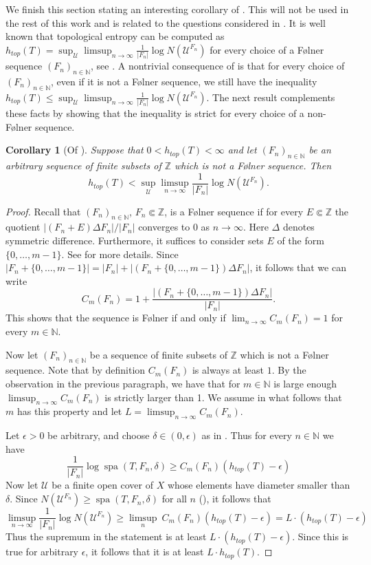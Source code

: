 \documentclass[a4paper,oneside]{amsart}
\renewcommand{\(}{\begin{dmath*}}
\renewcommand{\)}{\end{dmath*}}
\newtheorem{corollary}[theorem]{Corollary}
\theoremstyle{definition}
\newcommand{\N}{\mathbb{N}}
\newcommand{\Z}{\mathbb{Z}}
\newcommand{\U}{\mathcal{U}}
\newcommand{\spa}{\operatorname{spa}}
\begin{document}
We finish this section stating an interesting corollary of . This will not be used in the rest of this work and is related to the questions considered  in \cite{kolyada_shearers_2016}. It is well known that topological entropy can be computed as $h_{top}(T)=\sup_{\U}\limsup_{n\to\infty}\frac{1}{|F_n|}\log N(\U^{F_n})$  for every choice of a F\o lner sequence $(F_n)_{n\in\N}$,  see \cite{kolyada_shearers_2016}. A nontrivial consequence of  
is that for every choice of  $(F_n)_{n\in\N}$, even if it is not a F\o lner sequence, we still have the inequality $h_{top}(T)\leq \sup_{\U}\limsup_{n\to\infty}\frac{1}{|F_n|}\log N(\U^{F_n})$. The next result  complements these facts by showing that the inequality is strict for every choice of a non-F\o lner sequence. 
\begin{corollary}[Of ]
Suppose that $0<h_{top}(T)<\infty$ and let $(F_n)_{n\in\N}$ be an arbitrary sequence of finite subsets of $\Z$ which is not a F\o lner sequence. Then 
\begin{equation}\label{limsup-nonfolner}h_{top}(T)<\sup_{\U}\limsup_{n\to \infty}\frac{1}{|F_n|}\log N(\U^{F_n}).\end{equation}
\end{corollary}
\begin{proof}
Recall that $(F_n)_{n\in\N}$, $F_n\Subset \Z$, is a F\o lner sequence if for every $E\Subset\Z$ the quotient $|(F_n+E)\Delta F_n|/|F_n|$ converges to $0$ as $n\to\infty$. Here $\Delta$ denotes symmetric difference. Furthermore, it suffices to consider sets $E$ of the form $\{0,\dots,m-1\}$. See  \cite[Proposition 4.6.1]{ceccherini-silberstein_cellular_2010} for more details. Since $|F_n+\{0,\dots,m-1\}|=|F_n|+|(F_n+\{0,\dots,m-1\})\Delta F_n|$, it follows that  we can write
\[C_m(F_n)=1+\frac{|(F_n+\{0,\dots,m-1\})\Delta F_n|}{|F_n|}.\]
This shows that the sequence is F\o lner if and only if $\lim_{n\to\infty}C_m(F_n)=1$ for every $m\in\N$. 

Now let $(F_n)_{n\in\N}$ be a sequence of finite subsets of $\Z$ which is not a F\o lner sequence. Note that by definition $C_m(F_n)$ is always at least $1$. By the observation in the previous paragraph, we have that for $m\in\N$ is large enough $\limsup_{n\to\infty}C_m(F_n)$ is strictly larger than 1. We assume in what follows that $m$ has this property and let $L=\limsup_{n\to\infty}C_m(F_n)$.  

Let $\epsilon>0$ be arbitrary, and choose $\delta\in(0,\epsilon)$ as in . Thus for every $n\in\N$ we have \[\frac{1}{|F_n|}\log \spa(T,F_n,\delta)\geq 
 C_m(F_n)(h_{top}(T) -\epsilon)\]
 Now let $\U$ be a finite open cover of $X$ whose elements have diameter smaller than $\delta$. Since $N(\U^{F_n})\geq \spa(T,F_n,\delta)$ for all $n$ (), it follows that 
 \( \limsup_{n\to\infty}\frac{1}{|F_n|}\log N(\U^{F_n}) \geq \limsup_n \ C_m(F_n)(h_{top}(T) -\epsilon) = L\cdot (h_{top}(T)-\epsilon)
 \)
 Thus the supremum in the statement is at least $L\cdot (h_{top}(T)-\epsilon)$. Since this is true for arbitrary $\epsilon$, it follows that it is at least  $L\cdot h_{top}(T)$.  
\end{proof}
\end{document}
